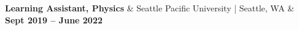 \textbf{Learning Assistant, Physics} & 
Seattle Pacific University | Seattle, WA & 
\textbf{Sept 2019 -- June 2022}